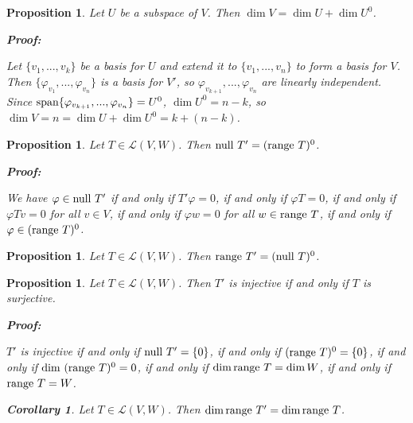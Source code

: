 \documentclass{article}
\theoremstyle{colontheorem}
\newtheorem{proposition}[theorem]{Proposition}
\newtheorem{corollary}{Corollary}[theorem]
\newcommand{\Span}{\textnormal{span}}
\newcommand{\Null}{\textnormal{null }}
\newcommand{\Range}{\textnormal{range }}
\newenvironment{Proposition}
{
	\begin{mdframed}[backgroundcolor=PropPink!10]
	\begin{proposition}
}
{
	\end{proposition}
	\end{mdframed}
	
	\vspace{.15in}
}
\newenvironment{Corollary}
{
	\begin{mdframed}[backgroundcolor=CorollaryBlue!10]
	\begin{corollary}
}
{
	\end{corollary}
	\end{mdframed}
	
	\vspace{.09in}
}
\newenvironment{Proof}
{
	\begin{mdframed}[backgroundcolor=ProofPurple!10]
	\textbf{Proof:}%
}
{
	\end{mdframed}
	
	\vspace{.085in}
}
\begin{document}
\begin{Proposition}
	
	Let $U$ be a subspace of $V$. Then $\dim V = \dim U + \dim U^0$.
	
	\begin{Proof}
		Let $\{v_1, ..., v_k\}$ be a basis for $U$ and extend it to $\{v_1, ..., v_n\}$ to form a basis for $V$. Then $\{\varphi_{v_1}, ..., \varphi_{v_n}\}$ is a basis for $V'$, so $\varphi_{v_{k+1}}, ..., \varphi_{v_n}$ are linearly independent. Since $\Span \{\varphi_{v_{k+1}}, ..., \varphi_{v_n}\} = U^0$, $\dim U^0 = n-k$, so $\dim V = n = \dim U + \dim U^0 = k + (n - k)$.
		
	\end{Proof}
	
\end{Proposition}



\begin{Proposition}
	
	Let $T \in \mathcal{L}(V,W)$. Then $\Null T' = (\Range T)^0$.
	
	\begin{Proof}
		We have $\varphi \in \Null T'$ if and only if $T'\varphi = 0$, if and only if $\varphi T = 0$, if and only if $\varphi Tv = 0$ for all $v \in V$, if and only if $\varphi w = 0$ for all $w \in \Range T$, if and only if $\varphi \in (\Range T)^0$.
		
	\end{Proof}
	
\end{Proposition}



\begin{Proposition}
	
	Let $T \in \mathcal{L}(V,W)$. Then $\Range T' = (\Null T)^0$.
	
\end{Proposition}



\begin{Proposition}
	
	Let $T \in \mathcal{L}(V,W)$. Then $T'$ is injective if and only if $T$ is surjective.
	
	\begin{Proof}
		$T'$ is injective if and only if $\Null T' = \{0\}$, if and only if $(\Range T)^0 = \{0\}$, if and only if $\dim\  (\Range T)^0 = 0$, if and only if $\dim \Range T = \dim W$, if and only if $\Range T = W$.
		
	\end{Proof}
	\vspace{.1in}
	\begin{Corollary}
		
		Let $T \in \mathcal{L}(V,W)$. Then $\dim \Range T' = \dim \Range T$.
		
	\end{Corollary}
	
\end{Proposition}
\end{document}
